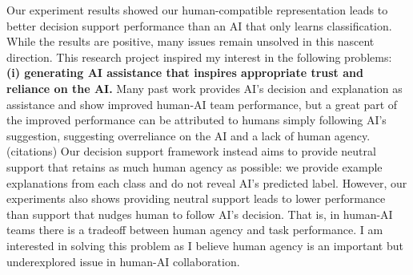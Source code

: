 

Our experiment results showed our human-compatible representation leads to better decision support performance than an AI that only learns classification. While the results are positive, many issues remain unsolved in this nascent direction. This research project inspired my interest in the following problems: 
\\
\textbf{(i) generating AI assistance that inspires appropriate trust and reliance on the AI.} 
Many past work provides AI's decision and explanation as assistance and show improved human-AI team performance, but a great part of the improved performance can be attributed to humans simply following AI's suggestion, suggesting overreliance on the AI and a lack of human agency. (citations)
Our decision support framework instead aims to provide neutral support that retains as much human agency as possible: we provide example explanations from each class and do not reveal AI's predicted label. 
However, our experiments also shows providing neutral support leads to lower performance than support that nudges human to follow AI's decision. 
That is, in human-AI teams there is a tradeoff between human agency and task performance. I am interested in solving this problem as I believe human agency is an important but underexplored issue in human-AI collaboration. 
\\

